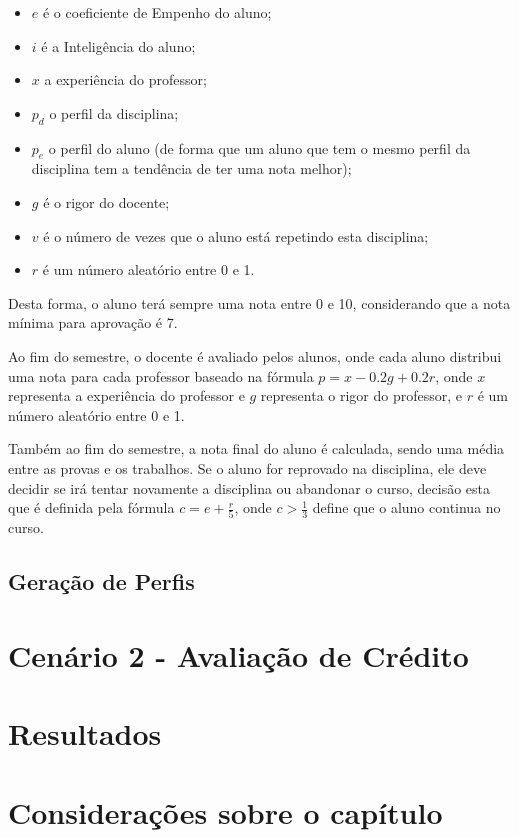 \begin{itemize}
  \item $e$ é o coeficiente de Empenho do aluno; 
  \item $i$ é a Inteligência do aluno;
  \item $x$ a experiência do professor; 
  \item $p_{d}$ o perfil da disciplina; 
  \item $p_{e}$ o perfil do aluno (de forma que um aluno que tem o mesmo perfil da disciplina tem a tendência de ter uma nota melhor);
  \item $g$ é o rigor do docente; 
  \item $v$ é o número de vezes que o aluno está repetindo esta disciplina; 
  \item $r$ é um número aleatório entre 0 e 1. 
\end{itemize}

Desta forma, o aluno terá sempre uma nota entre 0 e 10, considerando que a nota mínima para aprovação é 7.

Ao fim do semestre, o docente é avaliado pelos alunos, onde cada aluno distribui uma nota para cada professor baseado na fórmula $ p = x - 0.2g + 0.2r$, onde $x$ representa a experiência do professor e $g$ representa o rigor do professor, e $r$ é um número aleatório entre 0 e 1.

Também ao fim do semestre, a nota final do aluno é calculada, sendo uma média entre as provas e os trabalhos. Se o aluno for reprovado na disciplina, ele deve decidir se irá tentar novamente a disciplina ou abandonar o curso, decisão esta que é definida pela fórmula $ c = e + \frac{r}{5} $, onde $c > \frac{1}{3}$ define que o aluno continua no curso.


\subsection{Geração de Perfis}
\label{sec:cen1_perfis}




\section{Cenário 2 - Avaliação de Crédito}
\label{sec:cenario2}




\section{Resultados}
\label{sec:resultados}



\section{Considerações sobre o capítulo}
